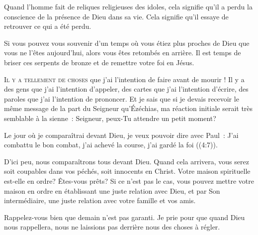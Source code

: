 Quand l'homme fait de reliques religieuses des idoles,
 cela signifie qu'il a perdu la conscience de la présence de Dieu dans sa vie.
 Cela signifie qu'il essaye de retrouver ce qui a été perdu. 


Si vous pouvez vous souvenir d'un temps où vous étiez plus proches de Dieu
 que vous ne l'êtes aujourd'hui, alors vous êtes retombés en arrière.
 Il est temps de briser ces serpents de bronze et de remettre votre foi en Jésus. 

\dvrule






\lettrine{I}{l y a tellement de choses} que j'ai l'intention de faire
 avant de mourir ! Il y a des gens que j'ai l'intention d'appeler,
 des cartes que j'ai l'intention d'écrire, des paroles que j'ai l'intention
 de prononcer. Et je sais que si je devais recevoir le même message
 de la part du Seigneur qu'Ézéchias, ma réaction initiale serait très semblable
 à la sienne~: \og Seigneur, peux-Tu attendre un petit moment? \fg{}


Le jour où je comparaîtrai devant Dieu, je veux pouvoir dire avec Paul~:
 \og J'ai combattu le bon combat, j'ai achevé la course,
 j'ai gardé la foi \fg{} ((4:7)). 

D'ici peu, nous comparaîtrons tous devant Dieu. Quand cela arrivera,
 vous serez soit coupables dans vos péchés, soit innocents en Christ.
 Votre maison spirituelle est-elle en ordre? Êtes-vous prêts?
 Si ce n'est pas le cas, vous pouvez mettre votre maison en ordre
 en établissant une juste relation avec Dieu, et par Son intermédiaire,
 une juste relation avec votre famille et vos amis. 

Rappelez-vous bien que demain n'est pas garanti. Je prie pour que quand Dieu
 nous rappellera, nous ne laissions pas derrière nous des choses à régler. 

